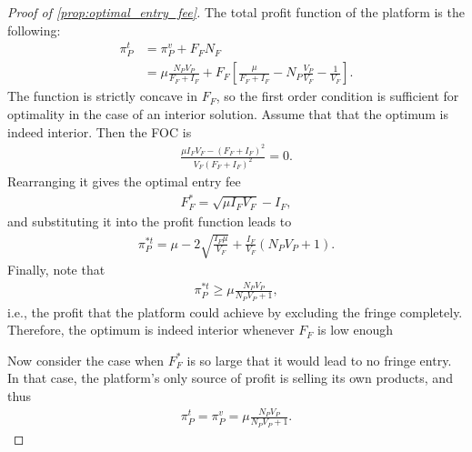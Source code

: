 \documentclass[a4paper]{article}
\begin{document}
\begin{proof}[Proof of \cref{prop:optimal_entry_fee}]
    The total profit function of the platform is the following:
    \begin{align*}
        \pi_P^t &= \pi_P^v + F_F N_F \\
        &= \mu \frac{N_P V_P}{F_F + I_F} + F_F \left[ \frac{\mu}{F_F + I_F} - N_P \frac{V_P}{V_F} - \frac{1}{V_F} \right].
    \end{align*}
    The function is strictly concave in $F_F$, so the first order condition is sufficient for optimality in the case of an interior solution.
    Assume that that the optimum is indeed interior.
    Then the FOC is
    \begin{align*}
        \frac{\mu I_F V_F - (F_F + I_F)^2}{V_F (F_F + I_F)^2} = 0.
    \end{align*}
    Rearranging it gives the optimal entry fee
    \begin{align*}
        F_F^* = \sqrt{\mu I_F V_F} - I_F,
    \end{align*}
    and substituting it into the profit function leads to
    \begin{align*}
        \pi_P^{*t} = \mu - 2\sqrt{\frac{I_F \mu}{V_F}} + \frac{I_F}{V_F} (N_P V_P + 1).
    \end{align*}
    Finally, note that
    \begin{align*}
        \pi_P^{*t} \geq \mu \frac{N_P V_P}{N_P V_P + 1},
    \end{align*}
    i.e., the profit that the platform could achieve by excluding the fringe completely.
    Therefore, the optimum is indeed interior whenever $F_F$ is low enough

    Now consider the case when $F_F^*$ is so large that it would lead to no fringe entry.
    In that case, the platform's only source of profit is selling its own products, and thus
    \begin{align*}
        \pi_P^{t} = \pi_P^{v} = \mu \frac{ N_P V_P}{N_P V_P + 1}.
    \end{align*}
\end{proof}
\end{document}
